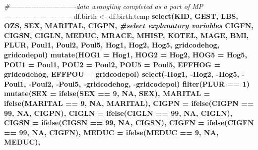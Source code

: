 \documentclass[
  12pt,
]{article}
\newenvironment{Shaded}{\begin{snugshade}}{\end{snugshade}}
\newcommand{\CommentTok}[1]{\textcolor[rgb]{0.56,0.35,0.01}{\textit{#1}}}
\newcommand{\DataTypeTok}[1]{\textcolor[rgb]{0.13,0.29,0.53}{#1}}
\newcommand{\DecValTok}[1]{\textcolor[rgb]{0.00,0.00,0.81}{#1}}
\newcommand{\KeywordTok}[1]{\textcolor[rgb]{0.13,0.29,0.53}{\textbf{#1}}}
\newcommand{\NormalTok}[1]{#1}
\newcommand{\OperatorTok}[1]{\textcolor[rgb]{0.81,0.36,0.00}{\textbf{#1}}}
\newcommand{\OtherTok}[1]{\textcolor[rgb]{0.56,0.35,0.01}{#1}}
\newcommand{\StringTok}[1]{\textcolor[rgb]{0.31,0.60,0.02}{#1}}
\begin{document}
\begin{Shaded}
\begin{Highlighting}[]
\CommentTok{#----------------------------data wrangling completed as a part of MP-----------------------------}
\NormalTok{df.birth <-}\StringTok{ }\NormalTok{df.birth.temp }\OperatorTok{%
\StringTok{  }\KeywordTok{select}\NormalTok{(KID, GEST, LBS, OZS, SEX, MARITAL, CIGPN, }\CommentTok{#select explanatory variables}
\NormalTok{         CIGFN, CIGSN, CIGLN, MEDUC, MRACE, MHISP, }
\NormalTok{         KOTEL, MAGE, BMI, PLUR, Poul1, Poul2, Poul5, }
\NormalTok{         Hog1, Hog2, Hog5, gridcodehog, gridcodepol) }\OperatorTok{%
\StringTok{  }\KeywordTok{mutate}\NormalTok{(}\DataTypeTok{HOG1 =}\NormalTok{ Hog1, }\DataTypeTok{HOG2 =}\NormalTok{ Hog2, }\DataTypeTok{HOG5 =}\NormalTok{ Hog5, }
         \DataTypeTok{POU1 =}\NormalTok{ Poul1, }\DataTypeTok{POU2 =}\NormalTok{ Poul2, }\DataTypeTok{POU5 =}\NormalTok{ Poul5, }
         \DataTypeTok{EFFHOG =}\NormalTok{ gridcodehog, }\DataTypeTok{EFFPOU =}\NormalTok{ gridcodepol) }\OperatorTok{%
\StringTok{  }\KeywordTok{select}\NormalTok{(}\OperatorTok{-}\NormalTok{Hog1, }\OperatorTok{-}\NormalTok{Hog2, }\OperatorTok{-}\NormalTok{Hog5, }\OperatorTok{-}\NormalTok{Poul1, }\OperatorTok{-}\NormalTok{Poul2, }\OperatorTok{-}\NormalTok{Poul5, }
         \OperatorTok{-}\NormalTok{gridcodehog, }\OperatorTok{-}\NormalTok{gridcodepol) }\OperatorTok{%
\StringTok{  }\KeywordTok{filter}\NormalTok{(PLUR }\OperatorTok{==}\StringTok{ }\DecValTok{1}\NormalTok{) }\OperatorTok{%
\StringTok{  }\KeywordTok{mutate}\NormalTok{(}\DataTypeTok{SEX =} \KeywordTok{ifelse}\NormalTok{(SEX }\OperatorTok{==}\StringTok{ }\DecValTok{9}\NormalTok{, }\OtherTok{NA}\NormalTok{, SEX),}
         \DataTypeTok{MARITAL =} \KeywordTok{ifelse}\NormalTok{(MARITAL }\OperatorTok{==}\StringTok{ }\DecValTok{9}\NormalTok{, }\OtherTok{NA}\NormalTok{, MARITAL),}
         \DataTypeTok{CIGPN =} \KeywordTok{ifelse}\NormalTok{(CIGPN }\OperatorTok{==}\StringTok{ }\DecValTok{99}\NormalTok{, }\OtherTok{NA}\NormalTok{, CIGPN),}
         \DataTypeTok{CIGLN =} \KeywordTok{ifelse}\NormalTok{(CIGLN }\OperatorTok{==}\StringTok{ }\DecValTok{99}\NormalTok{, }\OtherTok{NA}\NormalTok{, CIGLN),}
         \DataTypeTok{CIGSN =} \KeywordTok{ifelse}\NormalTok{(CIGSN }\OperatorTok{==}\StringTok{ }\DecValTok{99}\NormalTok{, }\OtherTok{NA}\NormalTok{, CIGSN),}
         \DataTypeTok{CIGFN =} \KeywordTok{ifelse}\NormalTok{(CIGFN }\OperatorTok{==}\StringTok{ }\DecValTok{99}\NormalTok{, }\OtherTok{NA}\NormalTok{, CIGFN),}
         \DataTypeTok{MEDUC =} \KeywordTok{ifelse}\NormalTok{(MEDUC }\OperatorTok{==}\StringTok{ }\DecValTok{9}\NormalTok{, }\OtherTok{NA}\NormalTok{, MEDUC),}
}}}}}
\end{Highlighting}
\end{Shaded}
\end{document}
